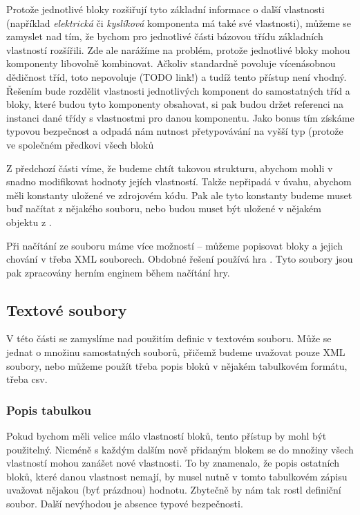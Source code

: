 Protože jednotlivé bloky rozšiřují tyto základní informace o další vlastnosti (například \textit{elektrická} či \textit{kyslíková} komponenta má také své vlastnosti), můžeme se zamyslet nad tím, že bychom pro jednotlivé části bázovou třídu základních vlastností rozšířili. Zde ale narážíme na problém, protože jednotlivé bloky mohou komponenty libovolně kombinovat. Ačkoliv \CPP{} standardně povoluje vícenásobnou dědičnost tříd, \UE{} toto nepovoluje (TODO link!) a tudíž tento přístup není vhodný. Řešením bude rozdělit vlastnosti jednotlivých komponent do samostatných tříd a bloky, které budou tyto komponenty obsahovat, si pak budou držet referenci na instanci dané třídy s vlastnostmi pro danou komponentu. Jako bonus tím získáme typovou bezpečnost a odpadá nám nutnost přetypovávání na vyšší typ (protože ve společném předkovi všech bloků

Z předchozí části víme, že budeme chtít takovou strukturu, abychom mohli v \UE{} snadno modifikovat hodnoty jejích vlastností. Takže nepřipadá v úvahu, abychom měli konstanty uložené ve zdrojovém kódu. Pak ale tyto konstanty budeme muset buď načítat z nějakého souboru, nebo budou muset být uložené v nějakém objektu z \UE{}.

Při načítání ze souboru máme více možností -- můžeme popisovat bloky a jejich chování v třeba XML souborech. Obdobné řešení používá hra \ME{}. Tyto soubory jsou pak zpracovány herním enginem během načítání hry. 

\subsection{Textové soubory}
V této části se zamyslíme nad použitím definic v textovém souboru. Může se jednat o množinu samostatných souborů, přičemž budeme uvažovat pouze XML soubory, nebo můžeme použít třeba popis bloků v nějakém tabulkovém formátu, třeba csv.

\subsubsection{Popis tabulkou}
Pokud bychom měli velice málo vlastností bloků, tento přístup by mohl být použitelný. Nicméně s každým dalším nově přidaným blokem se do množiny všech vlastností mohou zanášet nové vlastnosti.  To by znamenalo, že popis ostatních bloků, které danou vlastnost nemají, by musel nutně v tomto tabulkovém zápisu uvažovat nějakou (byť prázdnou) hodnotu. Zbytečně by nám tak rostl definiční soubor. Další nevýhodou je absence typové bezpečnosti. 

